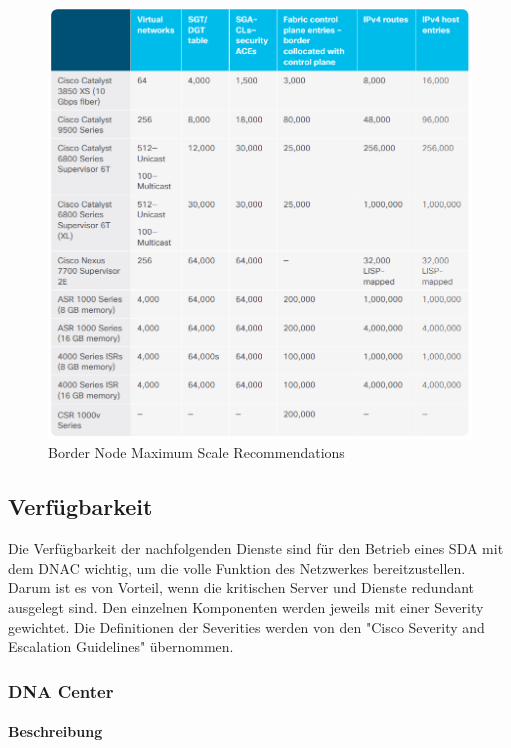 \begin{figure}[H]
	\centering
	\includegraphics[width=1\linewidth]{img/Analyse/MaxScale-BorderNode}
	\caption{Border Node Maximum Scale Recommendations \cite{sda-designguide} }
	\label{fig:Border Node Maximum Scale RecommendationsA}
\end{figure}



\subsection{Verfügbarkeit}
Die Verfügbarkeit der nachfolgenden Dienste sind für den Betrieb eines SDA mit dem DNAC wichtig, um die volle Funktion des Netzwerkes bereitzustellen. Darum ist es von Vorteil, wenn die kritischen Server und Dienste redundant ausgelegt sind. Den einzelnen Komponenten werden jeweils mit einer Severity gewichtet. Die Definitionen der Severities werden von den "Cisco Severity and Escalation Guidelines" übernommen. \cite{cisco-severity-guidelines}

\subsubsection{DNA Center}

\paragraph{Beschreibung}

